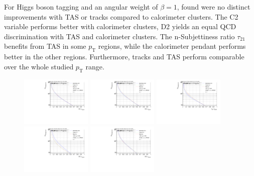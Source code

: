 For Higgs boson tagging and an angular weight of $\beta=1$, found were no distinct improvements with TAS or tracks compared to calorimeter clusters. The C2 variable performs better with calorimeter clusters, D2 yields an equal QCD discrimination with TAS and calorimeter clusters. The n-Subjettiness ratio $\tau_{21}$ benefits from TAS in some $p_{\mathrm{T}}$ regions, while the calorimeter pendant performs better in the other regions. Furthermore, tracks and TAS perform comparable over the whole studied $p_{\mathrm{T}}$ range. 
\begin{figure}[htp]
\includegraphics[width=0.3\textwidth]{sascha_input/plots/Higgs/ROC/Beta1/ROC_ALL_h_recoJet_C2_bin2.pdf} 
\includegraphics[width=0.3\textwidth]{sascha_input/plots/Higgs/ROC/Beta1/ROC_ALL_h_recoJet_D2_bin2.pdf} 
\includegraphics[width=0.3\textwidth]{sascha_input/plots/Higgs/ROC/Beta1/ROC_ALL_h_recoJet_nSub21_bin2.pdf}
\bigskip
\includegraphics[width=0.3\textwidth]{sascha_input/plots/Higgs/ROC/Beta1/ROC_ALL_h_recoJet_C2_bin5.pdf} \hspace{6mm}
\includegraphics[width=0.3\textwidth]{sascha_input/plots/Higgs/ROC/Beta1/ROC_ALL_h_recoJet_D2_bin5.pdf} \hspace{6mm}

\end{figure}
